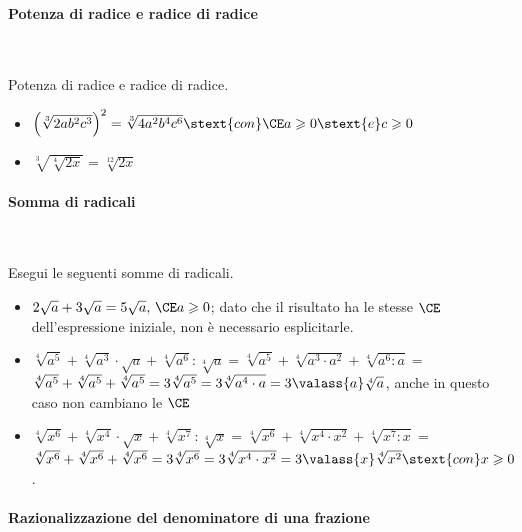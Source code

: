 \paragraph{Potenza di radice e radice di radice}~

\begin{esempio}{}{}
Potenza di radice e radice di radice.
\begin{itemize}
\item \(\left(\sqrt[3]{2ab^2c^3}\right)^2=\sqrt[3]{4a^2b^4c^6}
\stext{con} \CE a \geqslant 0 \stext{e} c \geqslant 0\)
\item \(\sqrt[3]{\sqrt[4]{2x}}=\sqrt[12]{2x}\)
\end{itemize}
\end{esempio}


\paragraph{Somma di radicali}~

\begin{esempio}{}{}
Esegui le seguenti somme di radicali.
\begin{itemize} [left=0mm]
\item \(2\sqrt a+3\sqrt a=5\sqrt a,\,\CE a \geqslant 0\);
dato che il risultato ha le stesse \(\CE\) dell'espressione iniziale, 
non è necessario esplicitarle.
\item 
\(\sqrt[4]{a^5}+\sqrt[4]{a^3}\cdot \sqrt{a} + \sqrt[4]{a^6}:\sqrt[4]{a} = 
\sqrt[4]{a^5}+\sqrt[4]{a^3\cdot a^2}+\sqrt[4]{a^6:a}=\)\\
\(\sqrt[4]{a^5}+\sqrt[4]{a^5}+\sqrt[4]{a^5}=3\sqrt[4]{a^5}=
  3\sqrt[4]{a^4\cdot a}=3 \valass{a}\sqrt[4]{a}\), 
anche in questo caso non cambiano le \(\CE\) 
\item 
\(\sqrt[4]{x^6}+\sqrt[4]{x^4}\cdot \sqrt{x} + \sqrt[4]{x^7}:\sqrt[4]{x} = 
\sqrt[4]{x^6}+\sqrt[4]{x^4\cdot x^2}+\sqrt[4]{x^7:x}=\)\\
\(\sqrt[4]{x^6}+\sqrt[4]{x^6}+\sqrt[4]{x^6} =3\sqrt[4]{x^6}=
  3\sqrt[4]{x^4\cdot x^2} = 3 \valass{x}\sqrt[4]{x^2}
  \stext{con} x \geqslant 0\). 
\end{itemize}
\end{esempio}
% 

\paragraph{Razionalizzazione del denominatore di una frazione}~

